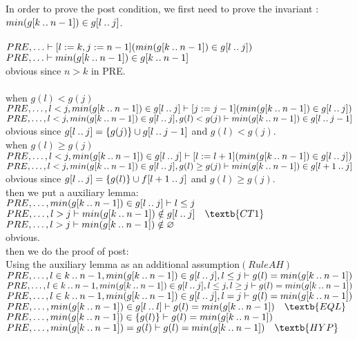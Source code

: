 \documentclass[11pt,a4paper,fleqn]{article}
\begin{document}
\noindent
In order to prove the post condition, we first need to prove the invariant : $ min(g[k \mathbin{.\mkern1mu.} n-1]) \in g[l \mathbin{.\mkern1mu.} j] $.\\
\\
$PRE,\ldots \vdash [l:=k,j:=n-1](min(g[k \mathbin{.\mkern1mu.} n-1]) \in g[l \mathbin{.\mkern1mu.} j]) $\\
$PRE,\ldots \vdash min(g[k \mathbin{.\mkern1mu.} n-1]) \in g[k \mathbin{.\mkern1mu.} n-1] $\\
obvious since $n > k$ in PRE.\\

\noindent
{}\\
when $ g(l)<g(j) $\\
$PRE,\ldots,l<j,min(g[k \mathbin{.\mkern1mu.} n-1]) \in g[l \mathbin{.\mkern1mu.} j] \vdash [j:=j-1](min(g[k \mathbin{.\mkern1mu.} n-1]) \in g[l \mathbin{.\mkern1mu.} j]) $\\
$PRE,\ldots,l<j,min(g[k \mathbin{.\mkern1mu.} n-1]) \in g[l \mathbin{.\mkern1mu.} j],g(l)<g(j) \vdash min(g[k \mathbin{.\mkern1mu.} n-1]) \in g[l \mathbin{.\mkern1mu.} j-1] $\\ 
obvious since $g[l \mathbin{.\mkern1mu.} j] = \{g(j)\} \cup g[l \mathbin{.\mkern1mu.} j-1] $ and $ g(l)<g(j)$.\\ 
when $ g(l) \ge g(j) $\\
$PRE,\ldots,l<j,min(g[k \mathbin{.\mkern1mu.} n-1]) \in g[l \mathbin{.\mkern1mu.} j] \vdash [l:=l+1](min(g[k \mathbin{.\mkern1mu.} n-1]) \in g[l \mathbin{.\mkern1mu.} j]) $\\
$PRE,\ldots,l<j,min(g[k \mathbin{.\mkern1mu.} n-1]) \in g[l \mathbin{.\mkern1mu.} j],g(l) \ge g(j) \vdash min(g[k \mathbin{.\mkern1mu.} n-1]) \in g[l+1 \mathbin{.\mkern1mu.} j] $\\
obvious since $g[l \mathbin{.\mkern1mu.} j] = \{g(l)\} \cup f[l+1 \mathbin{.\mkern1mu.} j] $ and $g(l) \ge g(j). $\\

\noindent
then we put a auxiliary lemma:\\
$PRE, \ldots ,min(g[k \mathbin{.\mkern1mu.} n-1]) \in g[l \mathbin{.\mkern1mu.} j] \vdash l \le j $\\
$PRE, \ldots, l>j \vdash min(g[k \upto n-1]) \notin g[l \upto j] \quad \textb{CT1}$\\
$PRE, \ldots, l>j \vdash min(g[k \mathbin{.\mkern1mu.} n-1]) \notin \mathord\varnothing $\\
obvious.\\

\noindent
then we do the proof of post:\\
Using the auxiliary lemma as an additional assumption$(Rule AH)$\\
$PRE,\ldots,l \in k \mathbin{.\mkern1mu.} n-1,min(g[k \mathbin{.\mkern1mu.} n-1]) \in g[l \mathbin{.\mkern1mu.} j],l \le j \vdash g(l) = min(g[k \mathbin{.\mkern1mu.} n-1])$\\
$PRE,\ldots,l \in k \mathbin{.\mkern1mu.} n-1,min(g[k \mathbin{.\mkern1mu.} n-1]) \in g[l \mathbin{.\mkern1mu.} j],l \le j,l \ge j \vdash g(l) = min(g[k \mathbin{.\mkern1mu.} n-1])$\\
$PRE,\ldots,l \in k \mathbin{.\mkern1mu.} n-1,min(g[k \mathbin{.\mkern1mu.} n-1]) \in g[l \mathbin{.\mkern1mu.} j],l =j \vdash g(l) = min(g[k \mathbin{.\mkern1mu.} n-1])$\\
$PRE,\ldots,min(g[k \upto n-1]) \in g[l \upto l] \vdash g(l) = min(g[k \upto n-1]) \quad \textb{EQL}$\\
$PRE,\ldots,min(g[k \mathbin{.\mkern1mu.} n-1]) \in \{g(l)\} \vdash g(l) = min(g[k \mathbin{.\mkern1mu.} n-1]) $\\
$PRE,\ldots,min(g[k \upto n-1]) = g(l) \vdash g(l) = min(g[k \upto n-1]) \quad \textb{HYP}$\\
\end{document}
